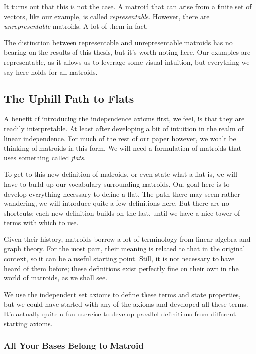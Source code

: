 \documentclass[12pt,oneside]{../../sfsuthesis}
\begin{document}
It turns out that this is not the case.
A matroid that can arise from a finite set of vectors, like our example, is called \emph{representable}.
However, there are \emph{unrepresentable} matroids.
A lot of them in fact.

The distinction between representable and unrepresentable matroids has no bearing on the results of this thesis, but it's worth noting here.
Our examples are representable, as it allows us to leverage some visual intuition, but everything we say here holds for all matroids.

\subsection{The Uphill Path to Flats}

A benefit of introducing the independence axioms first, we feel, is that they are readily interpretable.
At least after developing a bit of intuition in the realm of linear independence.
For much of the rest of our paper however, we won't be thinking of matroids in this form.
We will need a formulation of matroids that uses something called \emph{flats}.

To get to this new definition of matroids, or even state what a flat is, we will have to build up our vocabulary surrounding matroids.
Our goal here is to develop everything necessary to define a flat.
The path there may seem rather wandering, we will introduce quite a few definitions here.
But there are no shortcuts; each new definition builds on the last, until we have a nice tower of terms with which to use.

Given their history, matroids borrow a lot of terminology from linear algebra and graph theory.
For the most part, their meaning is related to that in the original context, so it can be a useful starting point.
Still, it is not necessary to have heard of them before;
these definitions exist perfectly fine on their own in the world of matroids, as we shall see.

We use the independent set axioms to define these terms and state properties, but we could have started with any of the axioms and developed all these terms.
It's actually quite a fun exercise to develop parallel definitions from different starting axioms.

\subsubsection{All Your Bases Belong to Matroid}
\end{document}
